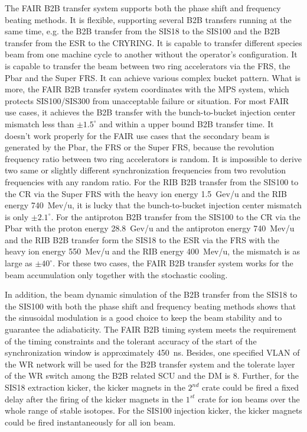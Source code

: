 The FAIR B2B transfer system supports both the phase shift and frequency beating methods. It is flexible, supporting several B2B transfers running at the same time, e.g. the B2B transfer from the SIS18 to the SIS100 and the B2B transfer from the ESR to the CRYRING. It is capable to transfer different species beam from one machine cycle to another without the operator’s configuration. It is capable to transfer the beam between two ring accelerators via the FRS, the Pbar and the Super FRS. It can achieve various complex bucket pattern. What is more, the FAIR B2B transfer system coordinates with the MPS system, which protects SIS100/SIS300 from unacceptable failure or situation. For most FAIR use cases, it achieves the B2B transfer with the bunch-to-bucket injection center mismatch less than $\pm1.5^\circ$ and within a upper bound B2B transfer time. It doesn't work properly for the FAIR use cases that the secondary beam is generated by the Pbar, the FRS or the Super FRS, because the revolution frequency ratio between two ring accelerators is random. It is impossible to derive two same or slightly different synchronization frequencies from two revolution frequencies with any random ratio. For the RIB B2B transfer from the SIS100 to the CR via the Super FRS with the heavy ion energy \SI{1.5}{Gev/u} and the RIB energy \SI{740}{Mev/u}, it is lucky that the bunch-to-bucket injection center mismatch is only $\pm2.1^\circ$. For the antiproton B2B transfer from the SIS100 to the CR via the Pbar with the proton energy \SI{28.8}{Gev/u} and the antiproton energy \SI{740}{Mev/u} and the RIB B2B transfer form the SIS18 to the ESR via the FRS with the heavy ion energy \SI{550}{Mev/u} and the RIB energy \SI{400}{Mev/u}, the mismatch is as large as $\pm40^\circ$. For these two cases, the FAIR B2B transfer system works for the beam accumulation only together with the stochastic cooling.  

In addition, the beam dynamic simulation of the B2B transfer from the SIS18 to the SIS100 with both the phase shift and frequency beating methods shows that the sinusoidal modulation is a good choice to keep the beam stability and to guarantee the adiabaticity. The FAIR B2B timing system meets the requirement of the timing constraints and the tolerant accuracy of the start of the synchronization window is approximately \SI{450}{\ns}. Besides, one specified VLAN of the WR network will be used for the B2B transfer system and the tolerate layer of the WR switch among the B2B related SCU and the DM is 8.  Further, for the SIS18 extraction kicker, the kicker magnets in the $2^{nd}$ crate could be fired a fixed delay after the firing of the kicker magnets in the $1^{st}$ crate for ion beams over the whole range of stable isotopes. For the SIS100 injection kicker, the kicker magnets could be fired instantaneously for all ion beam. 

